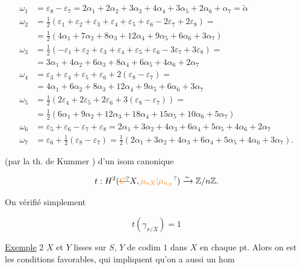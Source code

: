 \[
\begin{aligned}
\omega_1&=\varepsilon_8-\varepsilon_7=2\alpha_1+2\alpha_2+3\alpha_3+4\alpha_4+3\alpha_5+2\alpha_6+\alpha_7=\tilde\alpha\\
\omega_2&=\frac{1}{2}(\varepsilon_1+\varepsilon_2+\varepsilon_3+\varepsilon_4+\varepsilon_5+\varepsilon_6-2\varepsilon_7+2\varepsilon_8)=\\
&=\frac{1}{2}(4\alpha_1+7\alpha_2+8\alpha_3+12\alpha_4+9\alpha_5+6\alpha_6+3\alpha_7)\\
\omega_3&=\frac{1}{2}(-\varepsilon_1+\varepsilon_2+\varepsilon_3+\varepsilon_4+\varepsilon_5+\varepsilon_6-3\varepsilon_7+3\varepsilon_8)=\\
&=3\alpha_1+4\alpha_2+6\alpha_3+8\alpha_4+6\alpha_5+4\alpha_6+2\alpha_7\\
\omega_4&=\varepsilon_3+\varepsilon_4+\varepsilon_5+\varepsilon_6+2(\varepsilon_8-\varepsilon_7)=\\
&=4\alpha_1+6\alpha_2+8\alpha_3+12\alpha_4+9\alpha_5+6\alpha_6+3\alpha_7\\
\omega_5&=\frac{1}{2}(2\varepsilon_4+2\varepsilon_5+2\varepsilon_6+3(\varepsilon_8-\varepsilon_7))=\\
&=\frac{1}{2}(6\alpha_1+9\alpha_2+12\alpha_3+18\alpha_4+15\alpha_5+10\alpha_6+5\alpha_7)\\
\omega_6&=\varepsilon_5+\varepsilon_6-\varepsilon_7+\varepsilon_8=2\alpha_1+3\alpha_2+4\alpha_3+6\alpha_4+5\alpha_5+4\alpha_6+2\alpha_7\\
\omega_7&=\varepsilon_6+\frac{1}{2}(\varepsilon_8-\varepsilon_7)=\frac{1}{2}(2\alpha_1+3\alpha_2+4\alpha_3+6\alpha_4+5\alpha_5+4\alpha_6+3\alpha_7).
\end{aligned}
\]

(par la th. de Kummer ) d'un isom canonique

\[
t:H^2(\deleted{\unsure{C}}X,\unsure{\mu_{nX}|\mu_{n_X}})\xrightarrow{\sim}\mathbb Z/n\mathbb Z.
\]

On  vérifié simplement

\[
t(\gamma_{x/X})=1
\]

\uline{Exemple} 2 \quad $X$ et $Y$ lisses sur $S$, $Y$ de codim $1$ dans $X$ en chaque pt. Alors on est  les conditions favorables, qui impliquent qu'on a aussi un hom


